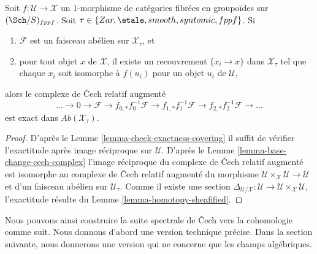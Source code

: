 \begin{proposition}
\label{proposition-exactness-cech-complex}
Soit $f : \mathcal{U} \to \mathcal{X}$ un $1$-morphisme de catégories fibrées
en groupoïdes sur $(\Sch/S)_{fppf}$. Soit
$\tau \in \{Zar, \etale, smooth, syntomic, fppf\}$.
Si
\begin{enumerate}
\item $\mathcal{F}$ est un faisceau abélien sur $\mathcal{X}_\tau$, et
\item pour tout objet $x$ de $\mathcal{X}$, il existe un recouvrement
$\{x_i \to x\}$ dans $\mathcal{X}_\tau$ tel que chaque $x_i$ soit isomorphe
à $f(u_i)$ pour un objet $u_i$ de $\mathcal{U}$,
\end{enumerate}
alors le complexe de {\v C}ech relatif augmenté
$$
\ldots \to 0 \to
\mathcal{F} \to
f_{0, *}f_0^{-1}\mathcal{F} \to
f_{1, *}f_1^{-1}\mathcal{F} \to
f_{2, *}f_2^{-1}\mathcal{F} \to \ldots
$$
est exact dans $\textit{Ab}(\mathcal{X}_\tau)$.
\end{proposition}

\begin{proof}
D'après le
Lemme \ref{lemma-check-exactness-covering}
il suffit de vérifier l'exactitude après image réciproque sur $\mathcal{U}$.
D'après le
Lemme \ref{lemma-base-change-cech-complex}
l'image réciproque du complexe de {\v C}ech relatif augmenté est isomorphe
au complexe de {\v C}ech relatif augmenté du morphisme
$\mathcal{U} \times_\mathcal{X} \mathcal{U} \to \mathcal{U}$
et d'un faisceau abélien sur $\mathcal{U}_\tau$. Comme il existe une section
$\Delta_{\mathcal{U}/\mathcal{X}} : \mathcal{U} \to
\mathcal{U} \times_\mathcal{X} \mathcal{U}$, l'exactitude résulte du
Lemme \ref{lemma-homotopy-sheafified}.
\end{proof}

\noindent
Nous pouvons ainsi construire la suite spectrale de {\v C}ech vers la cohomologie
comme suit. Nous donnons d'abord une version technique précise. Dans la section suivante,
nous donnerons une version qui ne concerne que les champs algébriques.

